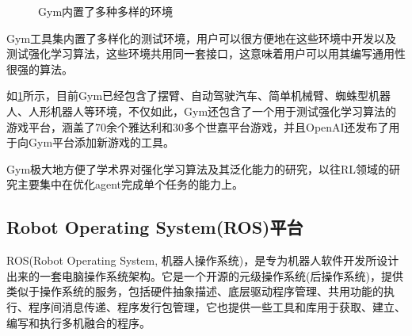 \documentclass[bachelor]{thesis-uestc}
\begin{document}
	\begin{figure}[h]
		\centering
		\caption{Gym内置了多种多样的环境}
		\label{openai}
	\end{figure}
	
	Gym工具集内置了多样化的测试环境，用户可以很方便地在这些环境中开发以及测试强化学习算法，这些环境共用同一套接口，这意味着用户可以用其编写通用性很强的算法。
	
	如\ref{openai}所示，目前Gym已经包含了摆臂、自动驾驶汽车、简单机械臂、蜘蛛型机器人、人形机器人等环境，不仅如此，Gym还包含了一个用于测试强化学习算法的游戏平台，涵盖了70余个雅达利和30多个世嘉平台游戏，并且OpenAI还发布了用于向Gym平台添加新游戏的工具。
	
	Gym极大地方便了学术界对强化学习算法及其泛化能力的研究，以往RL领域的研究主要集中在优化agent完成单个任务的能力上。
	
	\subsection{Robot Operating System(ROS)平台}
	ROS(Robot Operating System, 机器人操作系统)，是专为机器人软件开发所设计出来的一套电脑操作系统架构。它是一个开源的元级操作系统(后操作系统)，提供类似于操作系统的服务，包括硬件抽象描述、底层驱动程序管理、共用功能的执行、程序间消息传递、程序发行包管理，它也提供一些工具和库用于获取、建立、编写和执行多机融合的程序。
	
\end{document}
